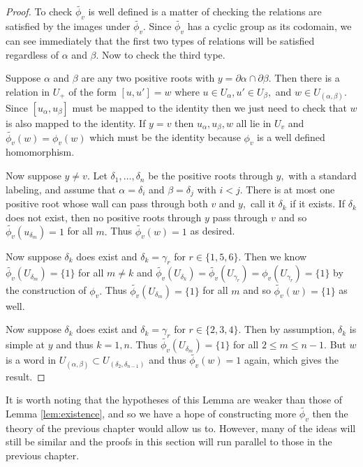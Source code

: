 \documentclass[class=book, crop=false]{standalone}
\begin{document}
\begin{proof}
	To check $\tilde{\phi_v}$ is well defined is a matter of checking the relations are satisfied by the images under $\tilde{\phi_v}.$ Since $\tilde{\phi_v}$ has a cyclic group as its codomain, we can see immediately that the first two types of relations will be satisfied regardless of $\alpha$ and $\beta.$ Now to check the third type.

	Suppose $\alpha$ and $\beta$ are any two positive roots with $y=\partial\alpha\cap \partial\beta.$ Then there is a relation in $U_+$ of the form $[u,u']=w$ where $u\in U_\alpha, u'\in U_\beta,$ and $w\in U_{(\alpha,\beta)}.$ Since $[u_\alpha,u_\beta]$ must be mapped to the identity then we just need to check that $w$ is also mapped to the identity. If $y=v$ then $u_\alpha,u_\beta,w$ all lie in $U_v$ and $\tilde{\phi_v}(w)=\phi_v(w)$ which must be the identity because $\phi_v$ is a well defined homomorphism.

	Now suppose $y\neq v.$ Let $\delta_1,\dots,\delta_n$ be the positive roots through $y,$ with a standard labeling, and assume that $\alpha=\delta_i$ and $\beta=\delta_j$ with $i<j.$ There is at most one positive root whose wall can pass through both $v$ and $y,$ call it $\delta_k$ if it exists. If $\delta_k$ does not exist, then no positive roots through $y$ pass through $v$ and so $\tilde{\phi_v}(u_{\delta_m})=1$ for all $m.$ Thus $\tilde{\phi_v}(w)=1$ as desired.

	Now suppose $\delta_k$ does exist and $\delta_k=\gamma_r$ for $r\in \{1,5,6\}.$ Then we know $\tilde{\phi_v}(U_{\delta_m})=\{1\}$ for all  $m\neq k$ and $\tilde{\phi_v}(U_{\delta_k})=\tilde{\phi_v}(U_{\gamma_r})=\phi_v(U_{\gamma_r})=\{1\}$ by the construction of $\phi_v.$ Thus $\tilde{\phi_v}(U_{\delta_m})=\{1\}$ for all $m$ and so $\tilde{\phi_v}(w)=\{1\}$ as well.

	Now suppose $\delta_k$ does exist and $\delta_k=\gamma_r$ for $r\in \{2,3,4\}.$ Then by assumption, $\delta_k$ is simple at $y$ and thus $k=1,n.$ Thus $\tilde{\phi_v}(U_{\delta_m})=\{1\}$ for all $2\le m\le n-1.$ But $w$ is a word in $U_{(\alpha,\beta)}\subset U_{(\delta_2,\delta_{n-1})}$ and thus $\tilde{\phi_v}(w)=1$ again, which gives the result.
\end{proof}

It is worth noting that the hypotheses of this Lemma are weaker than those of Lemma \ref{lem:existence}, and so we have a hope of constructing more $\tilde{\phi_v}$ then the theory of the previous chapter would allow us to. However, many of the ideas will still be similar and the proofs in this section will run parallel to those in the previous chapter.
\end{document}
